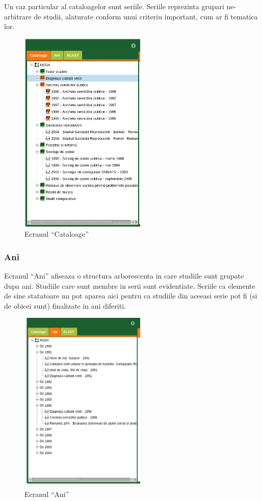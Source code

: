 Un caz particular al cataloagelor sunt seriile. Seriile reprezinta
grupari ne-arbitrare de studii, alaturate conform unui criteriu important,
cum ar fi tematica lor. 

\begin{figure}[H]
\begin{centering}
\includegraphics[width=6cm]{screenshots/left-panel-cataloage}
\par\end{centering}

\caption{Ecranul ``Cataloage''}
\end{figure}

\subsubsection{Ani}

Ecranul ``Ani'' afiseaza o structura arborescenta in care studiile
sunt grupate dupa ani. Studiile care sunt membre in serii sunt evidentiate.
Seriile ca elemente de sine statatoare nu pot aparea aici pentru ca
studiile din aceeasi serie pot fi (si de obicei sunt) finalizate in
ani diferiti. 

\begin{figure}[H]
\begin{centering}
\includegraphics[width=6cm]{screenshots/left-panel-ani}
\par\end{centering}
\caption{Ecranul ``Ani''}
\end{figure}

